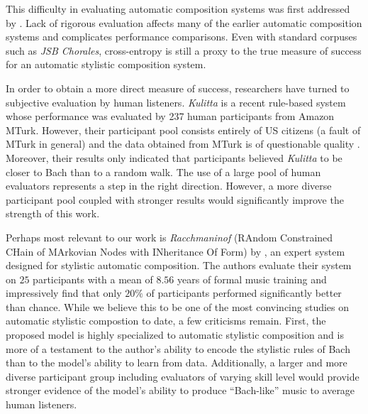 This difficulty in evaluating automatic composition systems was first addressed
by \citet{pearce2001towards}. Lack of rigorous evaluation affects many of the
earlier automatic composition systems and complicates performance comparisons. Even
with standard corpuses such as \textit{JSB Chorales}, cross-entropy is still a proxy
to the true measure of success for an automatic stylistic composition system.

In order to obtain a more direct measure of success, researchers have turned to
subjective evaluation by human listeners. \textit{Kulitta}
\citep{quick2014kulitta} is a recent rule-based system whose performance was
evaluated by 237 human participants from Amazon MTurk. However, their
participant pool consists entirely of US citizens (a fault of MTurk in general)
and the data obtained from MTurk is of questionable quality
\citep{downs2010your}. Moreover, their results only indicated that participants
believed \textit{Kulitta} to be closer to Bach than to a random walk. The
use of a large pool of human evaluators represents a step in the right direction.
However, a more diverse participant pool coupled with stronger results would
significantly improve the strength of this work.

Perhaps most relevant to our work is \textit{Racchmaninof} (RAndom Constrained
CHain of MArkovian Nodes with INheritance Of Form) by
\citet{collins2016developing}, an expert system designed for stylistic
automatic composition. The authors evaluate their system on $25$ participants
with a mean of $8.56$ years of formal music training and impressively find that
only $20\%$ of participants performed significantly better than chance. While
we believe this to be one of the most convincing studies on automatic stylistic
compostion to date, a few criticisms remain. First, the proposed model is
highly specialized to automatic stylistic composition and is more of a
testament to the author's ability to encode the stylistic rules of Bach than to
the model's ability to learn from data. Additionally, a larger and more diverse
participant group including evaluators of varying skill level would provide
stronger evidence of the model's ability to produce ``Bach-like'' music to
average human listeners.

